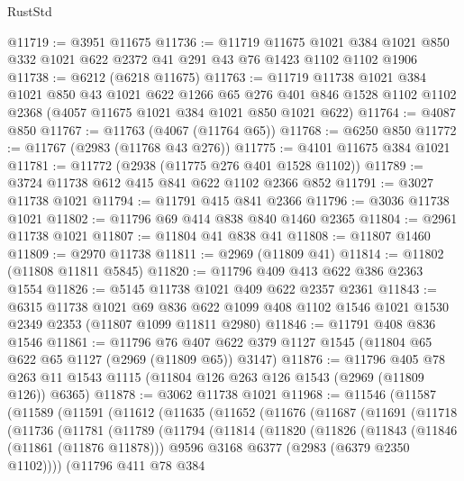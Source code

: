 \begin{lexlean}{RustStd}
\begin{coremodule}
@11719 := @3951 @11675
@11736 := @11719
    @11675
    @1021
    @384
    @1021
    @850
    @332
    @1021
    @622
    @2372
    @41
    @291
    @43
    @76
    @1423
    @1102
    @1102
    @1906
@11738 := @6212 (@6218 @11675)
@11763 := @11719
    @11738
    @1021
    @384
    @1021
    @850
    @43
    @1021
    @622
    @1266
    @65
    @276
    @401
    @846
    @1528
    @1102
    @1102
    @2368
    (@4057 @11675 @1021 @384 @1021 @850 @1021 @622)
@11764 := @4087 @850
@11767 := @11763 (@4067 (@11764 @65))
@11768 := @6250 @850
@11772 := @11767 (@2983 (@11768 @43 @276))
@11775 := @4101 @11675 @384 @1021
@11781 := @11772 (@2938 (@11775 @276 @401 @1528 @1102))
@11789 := @3724 @11738 @612 @415 @841 @622 @1102 @2366 @852
@11791 := @3027 @11738 @1021
@11794 := @11791 @415 @841 @2366
@11796 := @3036 @11738 @1021
@11802 := @11796 @69 @414 @838 @840 @1460 @2365
@11804 := @2961 @11738 @1021
@11807 := @11804 @41 @838 @41
@11808 := @11807 @1460
@11809 := @2970 @11738
@11811 := @2969 (@11809 @41)
@11814 := @11802 (@11808 @11811 @5845)
@11820 := @11796 @409 @413 @622 @386 @2363 @1554
@11826 := @5145 @11738 @1021 @409 @622 @2357 @2361
@11843 := @6315
    @11738
    @1021
    @69
    @836
    @622
    @1099
    @408
    @1102
    @1546
    @1021
    @1530
    @2349
    @2353
    (@11807 @1099 @11811 @2980)
@11846 := @11791 @408 @836 @1546
@11861 := @11796
    @76
    @407
    @622
    @379
    @1127
    @1545
    (@11804 @65 @622 @65 @1127 (@2969 (@11809 @65)) @3147)
@11876 := @11796
    @405
    @78
    @263
    @11
    @1543
    @1115
    (@11804 @126 @263 @126 @1543 (@2969 (@11809 @126)) @6365)
@11878 := @3062 @11738 @1021
@11968 := @11546
    (@11587
      (@11589
        (@11591
          (@11612
            (@11635
              (@11652
                (@11676
                  (@11687
                    (@11691
                      (@11718
                        (@11736
                          (@11781
                            (@11789
                              (@11794
                                (@11814
                                  (@11820
                                    (@11826
                                      (@11843
                                        (@11846 (@11861 (@11876 @11878)))
                                        @9596
                                        @3168
                                        @6377
                                        (@2983 (@6379 @2350 @1102))))
                                    (@11796
                                      @411
                                      @78
                                      @384

\end{coremodule}
\end{lexlean}
